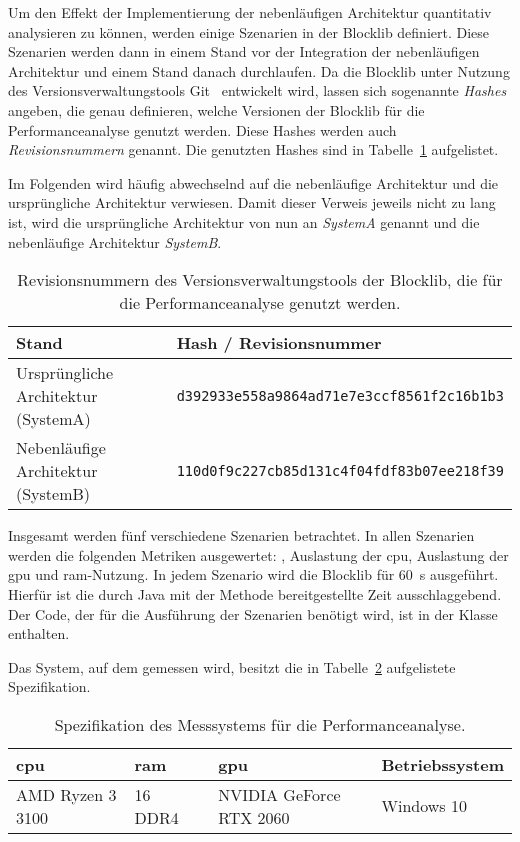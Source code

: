 Um den Effekt der Implementierung der nebenläufigen Architektur quantitativ analysieren zu können, werden einige Szenarien in der Blocklib definiert. Diese Szenarien werden dann in einem Stand vor der Integration der nebenläufigen Architektur und einem Stand danach durchlaufen. Da die Blocklib unter Nutzung des Versionsverwaltungstools Git~\cite{Chacon2014} entwickelt wird, lassen sich sogenannte \emph{Hashes} angeben, die genau definieren, welche Versionen der Blocklib für die Performanceanalyse genutzt werden. Diese Hashes werden auch \emph{Revisionsnummern} genannt. Die genutzten Hashes sind in Tabelle~\ref{tab:perfHash} aufgelistet.

Im Folgenden wird häufig abwechselnd auf die nebenläufige Architektur und die ursprüngliche Architektur verwiesen. Damit dieser Verweis jeweils nicht zu lang ist, wird die ursprüngliche Architektur von nun an \emph{SystemA} genannt und die nebenläufige Architektur \emph{SystemB}.

\begin{table}[!htbp]
	\centering
	\begin{tabular}{ll}
		\toprule
		Stand & Hash / Revisionsnummer \\
		\midrule
		Ursprüngliche Architektur (SystemA) & \texttt{d392933e558a9864ad71e7e3ccf8561f2c16b1b3} \\
		Nebenläufige Architektur (SystemB)& \texttt{110d0f9c227cb85d131c4f04fdf83b07ee218f39}\\
		\bottomrule
	\end{tabular}
	\caption{Revisionsnummern des Versionsverwaltungstools der Blocklib, die für die Performanceanalyse genutzt werden.}\label{tab:perfHash}
\end{table}

Insgesamt werden fünf verschiedene Szenarien betrachtet. In allen Szenarien werden die folgenden Metriken ausgewertet: \si{\fps}, Auslastung der \acs{cpu}, Auslastung der \ac{gpu} und \ac{ram}-Nutzung. In jedem Szenario wird die Blocklib für \SI{60}{\second} ausgeführt. Hierfür ist die durch Java mit der Methode  bereitgestellte Zeit ausschlaggebend. Der Code, der für die Ausführung der Szenarien benötigt wird, ist in der Klasse  enthalten.

Das System, auf dem gemessen wird, besitzt die in Tabelle~\ref{tab:spec} aufgelistete Spezifikation.

\begin{table}[!h]
	\centering
	\begin{tabular}[]{llll}
		\ac{cpu} & \ac{ram} & \ac{gpu} & Betriebssystem\\
		\midrule
		AMD Ryzen 3 3100 & \SI{16}{\giga\byte} DDR4 & NVIDIA GeForce RTX 2060 & Windows 10
	\end{tabular}
	\caption{Spezifikation des Messsystems für die Performanceanalyse.}\label{tab:spec}
\end{table}


